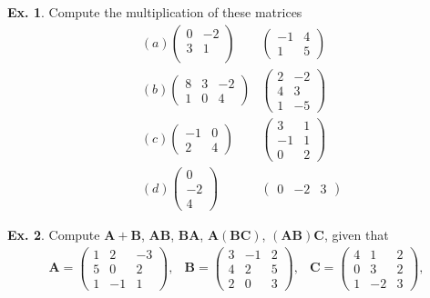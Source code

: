 \documentclass[10pt,a4paper]{book}
\theoremstyle{definition}\newtheorem{definition}{Definition}
\theoremstyle{definition}\newtheorem{fact}{Fact}
\theoremstyle{definition}\newtheorem{ex}{Ex.}
\theoremstyle{definition}\newtheorem{project}{Project}
\theoremstyle{definition}\newtheorem{problem}{Problem}
\theoremstyle{definition}\newtheorem{example}{Example}
\numberwithin{theorem}{chapter}
\numberwithin{corollary}{chapter}
\numberwithin{assumption}{chapter}
\numberwithin{definition}{chapter}
\numberwithin{prop}{chapter}
\numberwithin{notation}{chapter}
\numberwithin{problem}{chapter}
\numberwithin{example}{chapter}
\numberwithin{fact}{chapter}
\numberwithin{ex}{chapter}
\def\A{\mathbf A}
\def\B{\mathbf B}
\def\C{\mathbf C}
\begin{document}
	\begin{ex}
		Compute the multiplication of these  matrices
		\begin{align*}
			&(a) \begin{pmatrix}
				0 & -2 \\
				3 & 1 \\
			\end{pmatrix}  & \begin{pmatrix}
				-1 & 4 \\
				1 & 5
			\end{pmatrix} \\
			&(b) \begin{pmatrix}
				8 & 3  & -2 \\
				1 & 0  & 4  
			\end{pmatrix} & \begin{pmatrix}
				2 & -2 \\
				4 & 3 \\
				1 & -5
			\end{pmatrix} \\
			&(c) \begin{pmatrix}
				-1 & 0 \\
				2 & 4
			\end{pmatrix} & \begin{pmatrix}
				3 & 1 \\
				-1 & 1 \\
				0 & 2
			\end{pmatrix} \\
			&(d) \begin{pmatrix}
				0 \\
				-2 \\
				4
			\end{pmatrix} & \begin{pmatrix}
				0 & -2 & 3  
			\end{pmatrix}
		\end{align*}
	\end{ex}
	
	\begin{ex}
		Compute $\A + \B$, $\A \B$, $\B \A$, $\A ( \B \C)$, $(\A \B) \C$, given that
		\begin{align*}
			\A = \begin{pmatrix}
				1 & 2  & -3 \\
				5 & 0  & 2  \\
				1 & -1 & 1  
			\end{pmatrix}, & 
			\B = \begin{pmatrix}
				3 & -1 & 2  \\
				4 & 2  & 5  \\
				2 & 0  & 3  
			\end{pmatrix}, &
			\C = \begin{pmatrix}
				4 & 1  & 2  \\
				0 & 3  & 2  \\
				1 & -2 & 3  
			\end{pmatrix},  
		\end{align*}
	\end{ex}
	
\end{document}
